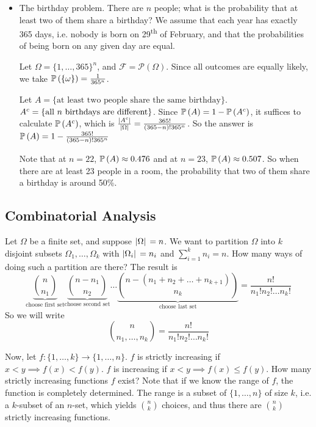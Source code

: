 \documentclass{article}
\begin{document}
\begin{itemize}
	\item The birthday problem. There are $n$ people; what is the probability that at least two of them share a birthday? We assume that each year has exactly 365 days, i.e. nobody is born on 29\textsuperscript{th} of February, and that the probabilities of being born on any given day are equal.

	      Let $\Omega = \{1, \dots, 365\}^n$, and $\mathcal F = \mathcal P(\Omega)$. Since all outcomes are equally likely, we take $\mathbb{P}\left({\{\omega\}}\right) = \frac{1}{365^n}$.

	      Let $A = \{ \text{at least two people share the same birthday} \}$. ${A}^c = \{ \text{all } n \text{ birthdays are different} \}$. Since $\mathbb{P}\left({A}\right) = 1 - \mathbb{P}\left({{A}^c}\right)$, it suffices to calculate $\mathbb{P}\left({{A}^c}\right)$, which is $\frac{\abs*{{A}^c}}{\abs*{\Omega}} = \frac{365!}{(365 - n)!365^n}$. So the answer is $\mathbb{P}\left({A}\right) = 1 - \frac{365!}{(365 - n)!365^n}$

	      Note that at $n=22$, $\mathbb{P}\left({A}\right) \approx 0.476$ and at $n=23$, $\mathbb{P}\left({A}\right) \approx 0.507$. So when there are at least 23 people in a room, the probability that two of them share a birthday is around 50\%.
\end{itemize}

\subsection{Combinatorial Analysis}
Let $\Omega$ be a finite set, and suppose $\abs*{\Omega} = n$. We want to partition $\Omega$ into $k$ disjoint subsets $\Omega_1, \dots, \Omega_k$ with $\abs*{\Omega_i} = n_i$ and $\sum_{i=1}^k n_i = n$. How many ways of doing such a partition are there? The result is
\[ \underbrace{\binom{n}{n_1}}_{\text{choose first set}}\underbrace{\binom{n-n_1}{n_2}}_{\text{choose second set}}\dots\underbrace{\binom{n-(n_1 + n_2 + \dots + n_{k+1})}{n_k}}_{\text{choose last set}} = \frac{n!}{n_1!n_2!\dots n_k!} \]
So we will write
\[ \binom{n}{n_1, \dots, n_k} = \frac{n!}{n_1!n_2!\dots n_k!} \]

Now, let $f\colon \{1, \dots, k\} \to \{1, \dots, n\}$. $f$ is strictly increasing if $x < y \implies f(x) < f(y)$. $f$ is increasing if $x < y \implies f(x) \leq f(y)$. How many strictly increasing functions $f$ exist? Note that if we know the range of $f$, the function is completely determined. The range is a subset of $\{1, \dots, n\}$ of size $k$, i.e. a $k$-subset of an $n$-set, which yields $\binom{n}{k}$ choices, and thus there are $\binom{n}{k}$ strictly increasing functions.
\end{document}
